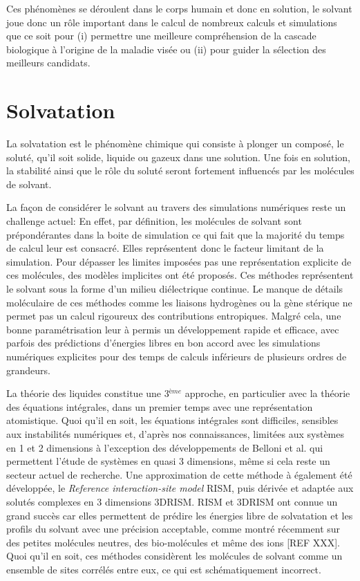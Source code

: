 Ces phénomènes se déroulent dans le corps humain et donc en solution, le solvant joue donc un rôle important dans le calcul de nombreux calculs et simulations que ce soit pour (i) permettre une meilleure compréhension de la cascade biologique à l'origine de la maladie visée ou (ii) pour guider la sélection des meilleurs candidats. 



\section{Solvatation}
La solvatation est le phénomène chimique qui consiste à plonger un composé, le soluté, qu'il soit solide, liquide ou gazeux dans une solution. Une fois en solution, la stabilité ainsi que le rôle du soluté seront fortement influencés par les molécules de solvant\cite{NickPace_protein_2004,levy_water_2004,Meyer_internal_1992,Ladbury_just_1996}. 

La façon de considérer le solvant au travers des simulations numériques reste un challenge actuel: En effet, par définition, les molécules de solvant sont prépondérantes dans la boite de simulation ce qui fait que la majorité du temps de calcul leur est consacré. Elles représentent donc le facteur limitant de la simulation. Pour dépasser les limites imposées pas une représentation explicite de ces molécules, des modèles implicites ont été proposés. Ces méthodes représentent le solvant sous la forme d'un milieu diélectrique continue. Le manque de détails moléculaire de ces méthodes comme les liaisons hydrogènes ou la gène stérique ne permet pas un calcul rigoureux des contributions entropiques. Malgré cela, une bonne paramétrisation leur à permis un développement rapide et efficace, avec parfois des prédictions d'énergies libres en bon accord avec les simulations numériques explicites pour des temps de calculs inférieurs de plusieurs ordres de grandeurs. 

La théorie des liquides constitue une 3$^{ème}$ approche, en particulier avec la théorie des équations intégrales, dans un premier temps avec une représentation atomistique. Quoi qu'il en soit, les équations intégrales sont difficiles, sensibles aux instabilités numériques et, d'après nos connaissances, limitées aux systèmes en 1 et 2 dimensions à l'exception des développements de Belloni et al. qui permettent l'étude de systèmes en quasi 3 dimensions, même si cela reste un secteur actuel de recherche. Une approximation de cette méthode à également été développée, le \textit{Reference interaction-site model} RISM, puis dérivée et adaptée aux solutés complexes en 3 dimensions 3DRISM. RISM et 3DRISM ont connue un grand succès car elles permettent de prédire les énergies libre de solvatation et les profils du solvant avec une précision acceptable, comme montré récemment sur des petites molécules neutres, des bio-molécules et même des ions [REF XXX]. Quoi qu'il en soit, ces méthodes considèrent les molécules de solvant comme un ensemble de sites corrélés entre eux, ce qui est schématiquement incorrect.

